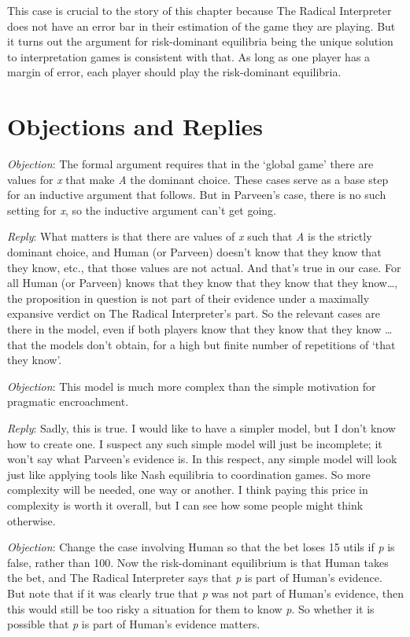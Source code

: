 \documentclass[
  11pt,
]{book}
\begin{document}
This case is crucial to the story of this chapter because The Radical Interpreter does not have an error bar in their estimation of the game they are playing. But it turns out the argument for risk-dominant equilibria being the unique solution to interpretation games is consistent with that. As long as one player has a margin of error, each player should play the risk-dominant equilibria.

\hypertarget{evsolution}{%
\section{Objections and Replies}\label{evsolution}}

\emph{Objection}: The formal argument requires that in the `global game' there are values for \emph{x} that make \emph{A} the dominant choice. These cases serve as a base step for an inductive argument that follows. But in Parveen's case, there is no such setting for \emph{x}, so the inductive argument can't get going.

\emph{Reply}: What matters is that there are values of \emph{x} such that \emph{A} is the strictly dominant choice, and Human (or Parveen) doesn't know that they know that they know, etc., that those values are not actual. And that's true in our case. For all Human (or Parveen) knows that they know that they know that they know\ldots, the proposition in question is not part of their evidence under a maximally expansive verdict on The Radical Interpreter's part. So the relevant cases are there in the model, even if both players know that they know that they know \ldots{} that the models don't obtain, for a high but finite number of repetitions of `that they know'.

\emph{Objection}: This model is much more complex than the simple motivation for pragmatic encroachment.

\emph{Reply}: Sadly, this is true. I would like to have a simpler model, but I don't know how to create one. I suspect any such simple model will just be incomplete; it won't say what Parveen's evidence is. In this respect, any simple model will look just like applying tools like Nash equilibria to coordination games. So more complexity will be needed, one way or another. I think paying this price in complexity is worth it overall, but I can see how some people might think otherwise.

\emph{Objection}: Change the case involving Human so that the bet loses 15 utils if \emph{p} is false, rather than 100. Now the risk-dominant equilibrium is that Human takes the bet, and The Radical Interpreter says that \emph{p} is part of Human's evidence. But note that if it was clearly true that \emph{p} was not part of Human's evidence, then this would still be too risky a situation for them to know \emph{p}. So whether it is possible that \emph{p} is part of Human's evidence matters.
\end{document}
